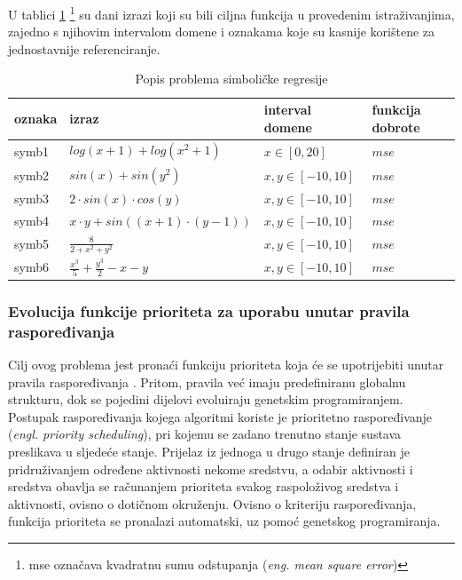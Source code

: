 U tablici \ref{bla} \footnote{mse označava kvadratnu sumu odstupanja (\textit{eng. mean square error})} su dani izrazi koji su bili ciljna funkcija u provedenim istraživanjima, zajedno s njihovim intervalom domene i oznakama koje su kasnije korištene za jednostavnije referenciranje.

\begin{table}[H]
 	\centering
 \caption{Popis problema simboličke regresije}
    \begin{tabular}{| l | l | l | l |}
    \hline
    oznaka & izraz & interval domene & funkcija dobrote\\ \hline
    symb1 & $log(x+1)+log(x^2+1)$ & $x \in [0, 20]$ & $mse$ \\ \hline
    symb2 & $sin(x) + sin(y^2)$ & $x, y \in [-10, 10]$ & $mse$\\ \hline
    symb3 & $2 \cdot sin(x) \cdot cos(y)$ & $x, y \in [-10, 10]$ & $mse$\\ \hline
    symb4 & $x \cdot y + sin((x+1) \cdot (y-1))$ & $x, y \in [-10, 10]$ & $mse$\\ \hline
    symb5 & \Large{ $\frac{8}{2 + x^2 + y^2}$ }& $x, y \in [-10, 10]$ & $mse$\\ \hline
    symb6 & $\frac{x^3}{5} + \frac{y^3}{2} - x - y$ & $x, y \in [-10, 10]$ & $mse$\\ \hline
    \end{tabular}
    
   
    \label{bla}
\end{table}

\subsubsection{Evolucija funkcije prioriteta za uporabu unutar pravila raspoređivanja}
Cilj ovog problema jest pronaći funkciju prioriteta koja će se upotrijebiti unutar pravila raspoređivanja \cite{jakobovic}. Pritom, pravila već imaju predefiniranu globalnu strukturu, dok se pojedini dijelovi evoluiraju genetskim programiranjem. Postupak raspoređivanja kojega algoritmi koriste je prioritetno raspoređivanje (\textit{engl. priority scheduling}), pri kojemu se zadano trenutno stanje sustava preslikava u sljedeće stanje. Prijelaz iz jednoga u drugo stanje definiran je pridruživanjem određene aktivnosti nekome sredstvu, a odabir aktivnosti i sredstva obavlja se računanjem prioriteta svakog raspoloživog sredstva i aktivnosti, ovisno o dotičnom okruženju. Ovisno o kriteriju raspoređivanja, funkcija prioriteta se pronalazi automatski, uz pomoć genetskog programiranja.


